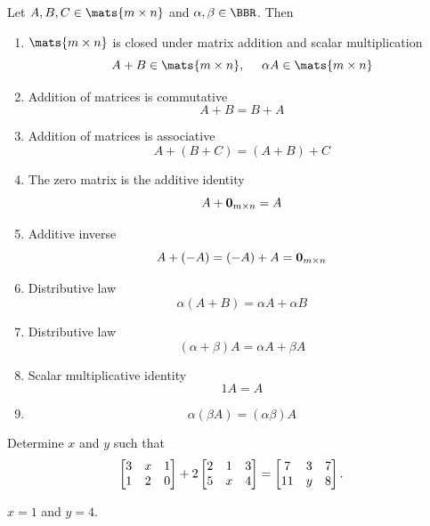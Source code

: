 \begin{thm}Let $A, B, C\in \mats{m\times n}$ and $\alpha, \beta \in \BBR$. Then
\begin{enumerate}
\item $\mats{m\times n}$ is closed under matrix addition
and scalar multiplication
\begin{equation}\label{m:closure} A + B \in \mats{m\times n}, \
\ \ \ \alpha A \in \mats{m\times n}
\end{equation}
\item Addition of matrices is commutative
\begin{equation}\label{m:commutative} A + B = B + A
\end{equation}
\item Addition of matrices is associative
\begin{equation}\label{m:associative} A + (B + C) = (A+B)+C
\end{equation}
\item  The zero matrix is the additive identity
\begin{equation}\label{m:existence0}A+ {\bf 0}_{m\times n}=A
\end{equation}
\item Additive inverse
\begin{equation}\label{m:existence_additive_inverse} 
A + (-A) = (-A) + A = {\bf 0}_{m\times n}
\end{equation}
\item Distributive law
\begin{equation}\label{m:distributive_law1} \alpha (A + B) =
\alpha A + \alpha B
\end{equation}
\item Distributive law
\begin{equation}\label{m:distributive_law2} (\alpha + \beta)A =
\alpha A + \beta A
\end{equation}
\item Scalar multiplicative identity
\begin{equation}\label{m:1A} 1A = A
\end{equation}
\item   
\begin{equation}\label{m:abA} \alpha (\beta A) =
(\alpha\beta)A
\end{equation}

\end{enumerate}
\end{thm}


\begin{exer}
Determine $x$ and $y$ such that $$\begin{bmatrix} 3 & x & 1 \cr 1
& 2 & 0 \cr
\end{bmatrix} + 2\begin{bmatrix} 2 & 1 & 3 \cr 5 & x & 4 \cr\end{bmatrix} = \begin{bmatrix}
7 & 3 & 7 \cr 11 & y & 8 \cr\end{bmatrix}.$$
\vspace*{1.5in}
\begin{answer} $x = 1$ and $y = 4$.  \end{answer}
\end{exer}

